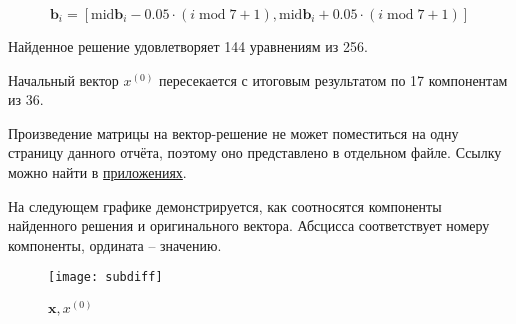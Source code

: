 \begin{equation}
\mathbf{b}_i = [\mathrm{mid} \mathbf{b}_i - 0.05 \cdot (i \; \mathrm{mod} \; 7 + 1),
\mathrm{mid} \mathbf{b}_i + 0.05 \cdot (i \; \mathrm{mod} \; 7 + 1)]
\end{equation}

Найденное решение удовлетворяет 144 уравнениям из 256.

Начальный вектор $x^{(0)}$ пересекается с итоговым результатом по 17 компонентам из 36.

Произведение матрицы на вектор-решение не может поместиться на одну страницу данного отчёта, поэтому оно представлено в отдельном файле. Ссылку можно найти в \hyperref[app]{приложениях}.

На следующем графике демонстрируется, как соотносятся компоненты найденного решения и оригинального вектора. Абсцисса соответствует номеру компоненты, ордината -- значению.

\begin{figure}[H]
	\begin{center}
		\texttt{[image: subdiff]}
		\caption{$\mathbf{x}, x^{(0)}$}
	\end{center}
\end{figure}